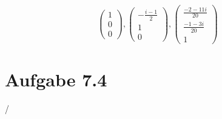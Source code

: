 \documentclass{article} %
\begin{document}
\[
 \begin{pmatrix}
1\\0\\0
\end{pmatrix}, 
\begin{pmatrix}
-\frac{i-1}{2}\\1\\0
\end{pmatrix}  , \left(\begin{matrix}
\frac{-2-11i}{20} \\
\frac{-1-3i}{20} \\
1
\end{matrix}\right)
\]
\section{Aufgabe 7.4}
/
\end{document}
